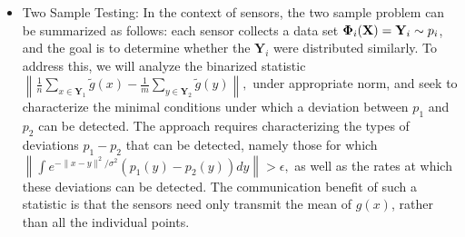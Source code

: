 \begin{itemize}
\item Two Sample Testing: 
In the context of sensors, the two sample problem can be summarized as follows: each sensor collects a data set $\mathbf{\Phi}_i(\mathbf{X})=\mathbf{Y}_i\sim p_i$, and the goal is to determine whether the $\mathbf{Y}_i$ were distributed similarly.  %
To address this, we will analyze the binarized statistic $\left\|\frac{1}{n}\sum_{x\in \mathbf{Y}_1} \widetilde{g}(x) - \frac{1}{m}\sum_{y\in \mathbf{Y}_2} \widetilde{g}(y)\right\|,$
under appropriate norm, and seek to characterize the minimal conditions under which a deviation between $p_1$ and $p_2$ can be detected.   The approach requires characterizing the types of deviations $p_1 - p_2$ that can be detected, namely those for which $\left\|\int e^{-\|x-y\|^2/\sigma^2} (p_1(y) - p_2(y)) dy \right\| > \epsilon,$ as well as the rates at which these deviations can be detected.
The communication benefit of such a statistic is that the sensors need
only transmit the mean of $g(x)$, rather than all the individual
points.  %


\end{itemize}
